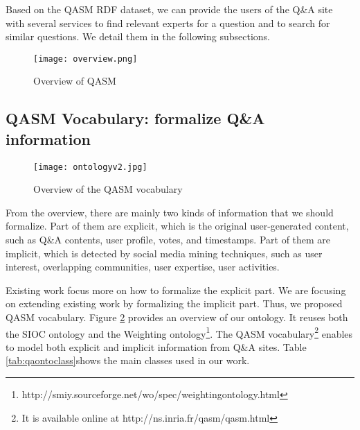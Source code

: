 Based on the QASM RDF dataset, we can provide the users of the Q\&A site with several services to find relevant experts for a question and to search for similar questions. We detail them in the following subsections.

\begin{figure}%
\centering
\texttt{[image: overview.png]}  
\caption{Overview of QASM}
\label{fig:overview} 
\end{figure}

\subsection{QASM Vocabulary: formalize Q\&A information}
\begin{figure}[htbp]
\centering
\texttt{[image: ontologyv2.jpg]}  
\caption{Overview of the QASM vocabulary}
\label{fig:coreontology} 
\end{figure}

From the overview, there are mainly two kinds of information that we should formalize. Part of them are explicit, which is the original user-generated content, such as Q\&A contents, user profile, votes, and timestamps. Part of them are implicit, which is detected by social media mining techniques, such as user interest, overlapping communities, user expertise, user activities. 

Existing work focus more on how to formalize the explicit part. We are focusing on extending existing work by formalizing the implicit part. Thus, we proposed QASM vocabulary.  Figure \ref{fig:coreontology} provides an overview of our ontology. It reuses both the SIOC ontology and the Weighting ontology\footnote{http://smiy.sourceforge.net/wo/spec/weightingontology.html}.
The QASM vocabulary\footnote{It is available online at http://ns.inria.fr/qasm/qasm.html} enables to model both explicit and implicit information from Q\&A sites. Table \ref{tab:qaontoclass}shows the main classes used in our work.



